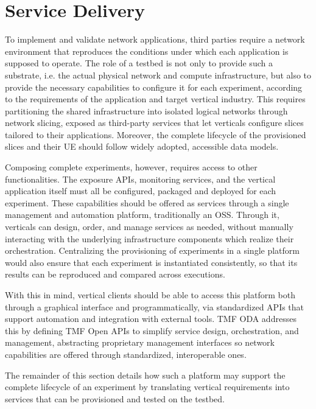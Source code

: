 \section{Service Delivery}
\label{chap:proposal:delivery}

To implement and validate network applications, third parties require a network environment that reproduces the conditions under which each application is supposed to operate. The role of a testbed is not only to provide such a substrate, i.e. the actual physical network and compute infrastructure, but also to provide the necessary capabilities to configure it for each experiment, according to the requirements of the application and target vertical industry. This requires partitioning the shared infrastructure into isolated logical networks through network slicing, exposed as third-party services that let verticals configure slices tailored to their applications. Moreover, the complete lifecycle of the provisioned slices and their UE should follow widely adopted, accessible data models.

Composing complete experiments, however, requires access to other functionalities. The exposure APIs, monitoring services, and the vertical application itself must all be configured, packaged and deployed for each experiment. These capabilities should be offered as services through a single management and automation platform, traditionally an OSS. Through it, verticals can design, order, and manage services as needed, without manually interacting with the underlying infrastructure components which realize their orchestration. Centralizing the provisioning of experiments in a single platform would also ensure that each experiment is instantiated consistently, so that its results can be reproduced and compared across executions.

With this in mind, vertical clients should be able to access this platform both through a graphical interface and programmatically, via standardized APIs that support automation and integration with external tools. TMF ODA addresses this by defining TMF Open APIs to simplify service design, orchestration, and management, abstracting proprietary management interfaces so network capabilities are offered through standardized, interoperable ones.

The remainder of this section details how such a platform may support the complete lifecycle of an experiment by translating vertical requirements into services that can be provisioned and tested on the testbed.


